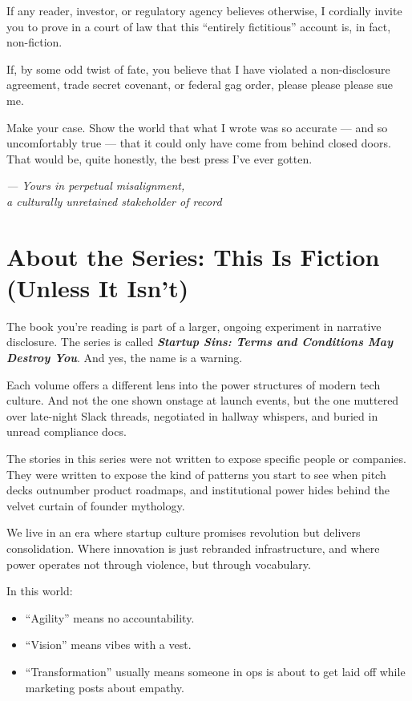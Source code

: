 \documentclass{article}
\begin{document}
  If any reader, investor, or regulatory agency believes otherwise, I cordially invite you to prove 
  in a court of law that this ``entirely fictitious'' account is, in fact, non-fiction.

  
  If, by some odd twist of fate, you believe that I have violated a non-disclosure agreement, 
  trade secret covenant, or federal gag order, please please please sue me.

  Make your case. Show the world that what I wrote was so accurate --- and so uncomfortably true --- 
  that it could only have come from behind closed doors. That would be, quite honestly, the best press 
  I’ve ever gotten.
  
  \begin{flushright}
    \textit{— Yours in perpetual misalignment,}\\
    \textit{a culturally unretained stakeholder of record}
    \end{flushright}

  \section*{About the Series: This Is Fiction (Unless It Isn’t)}

  The book you're reading is part of a larger, ongoing experiment in narrative disclosure.  
  The series is called \textbf{\textit{Startup Sins: Terms and Conditions May Destroy You}}. And yes, 
  the name is a warning.
  
  Each volume offers a different lens into the power structures of modern tech culture. And not the 
  one shown onstage at launch events, but the one muttered over late-night Slack threads, negotiated in 
  hallway whispers, and buried in unread compliance docs.
  
  The stories in this series were not written to expose specific people or companies.  
  They were written to expose the kind of patterns you start to see when pitch decks outnumber 
  product roadmaps, and institutional power hides behind the velvet curtain of founder mythology.
  
  We live in an era where startup culture promises revolution but delivers consolidation.
  Where innovation is just rebranded infrastructure, and where power operates not through violence, 
  but through vocabulary.
  
  In this world:
  
  \begin{itemize}
    \item ``Agility'' means no accountability.
    \item ``Vision'' means vibes with a vest.
    \item ``Transformation'' usually means someone in ops is about to get laid off while marketing posts about empathy.
  \end{itemize}
  
\end{document}
